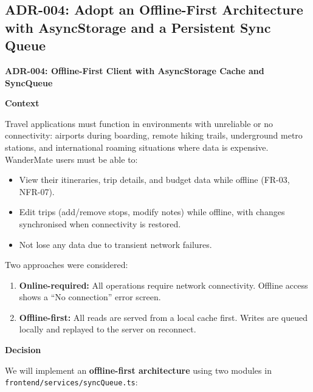 \documentclass[12pt, a4paper]{article}
\newcommand{\code}[1]{\texttt{\small #1}}
\newcommand{\reqid}[1]{\textsc{\small #1}}
\begin{document}
\subsection{ADR-004: Adopt an Offline-First Architecture with AsyncStorage and a Persistent Sync Queue}

\begin{tcolorbox}[adrbox]

\textbf{\large ADR-004: Offline-First Client with AsyncStorage Cache and SyncQueue}

\vspace{0.6em}
\textbf{Context}

Travel applications must function in environments with unreliable or no connectivity: airports during boarding, remote hiking trails, underground metro stations, and international roaming situations where data is expensive. WanderMate users must be able to:

\begin{itemize}
  \item View their itineraries, trip details, and budget data while offline (\reqid{FR-03}, \reqid{NFR-07}).
  \item Edit trips (add/remove stops, modify notes) while offline, with changes synchronised when connectivity is restored.
  \item Not lose any data due to transient network failures.
\end{itemize}

Two approaches were considered:
\begin{enumerate}
  \item \textbf{Online-required:} All operations require network connectivity. Offline access shows a ``No connection'' error screen.
  \item \textbf{Offline-first:} All reads are served from a local cache first. Writes are queued locally and replayed to the server on reconnect.
\end{enumerate}

\vspace{0.6em}
\textbf{Decision}

We will implement an \textbf{offline-first architecture} using two modules in \code{frontend/services/syncQueue.ts}:


\end{tcolorbox}
\end{document}
